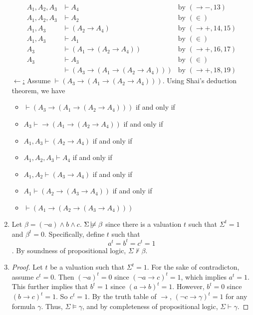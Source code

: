 \documentclass[12pt]{article}
\begin{document}
\begin{enumerate}
\begin{align}
            A_1,A_2,A_3 &\vdash A_4&\text{by }(\to -, 13)\\
            A_1,A_2,A_3 &\vdash A_2&\text{by }(\in )\\
            A_1, A_3&\vdash (A_2\to A_4)&\text{by }(\to +, 14, 15) \\
            A_1, A_3&\vdash A_1&\text{by }(\in) \\
            A_3&\vdash (A_1\to (A_2\to A_4))&\text{by }(\to +, 16, 17) \\
            A_3&\vdash A_3&\text{by }(\in) \\
            &\vdash (A_3\to (A_1\to (A_2\to A_4)))&\text{by }(\to +, 18, 19)
        \end{align}
        \underline{$\leftarrow$:} Assume $\vdash (A_3\to (A_1\to (A_2\to A_4)))$. Using Shai's deduction theorem, we have 
        \begin{itemize}
            \item $\vdash (A_3\to (A_1\to (A_2\to A_4)))$ if and only if
            \item $A_3 \vdash \to (A_1\to (A_2\to A_4))$ if and only if
            \item $A_1, A_3\vdash (A_2\to A_4)$ if and only if
            \item $A_1,A_2,A_3\vdash A_4$ if and only if
            \item $A_1,A_2\vdash (A_3\to A_4)$ if and only if
            \item $A_1\vdash (A_2\to (A_3\to A_4))$ if and only if 
            \item $\vdash (A_1\to (A_2\to (A_3\to A_4)))$
        \end{itemize}
    \item Let $\beta=(\neg a)\land b\land c$. $\Sigma\not\!\models \beta$ since there is a valuation $t$ such that $\Sigma^t=1$ and $\beta^t=0$. Specifically, define $t$ such that \[a^t=b^t=c^t=1\]. By soundness of propositional logic, $\Sigma\nvdash \beta$.
    \item 
    \begin{proof}
        Let $t$ be a valuation such that $\Sigma^t=1$. For the sake of contradicton, assume $c^t=0$. Then $(\neg a)^t=0$ since $(\neg a\to c)^t=1$, which implies $a^t=1$. This further implies that $b^t=1$ since $(a\to b)^t=1$. However, $b^t=0$ since $(b\to c)^t=1$. So $c^t=1$. By the truth table of $\to$, $(\neg c\to \gamma)^t=1$ for any formula $\gamma$. Thus, $\Sigma\models\gamma$, and by completeness of propositional logic, $\Sigma\vdash\gamma$.
    \end{proof}
\end{enumerate}
\end{document}

